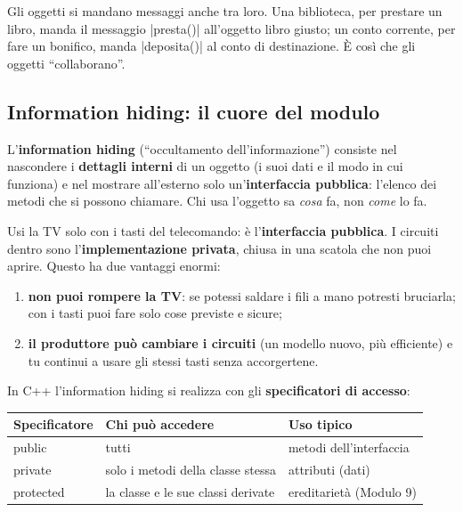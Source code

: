Gli oggetti si mandano messaggi anche tra loro. Una biblioteca, per prestare un
libro, manda il messaggio \cc|presta()| all'oggetto libro giusto; un conto
corrente, per fare un bonifico, manda \cc|deposita()| al conto di destinazione.
È così che gli oggetti ``collaborano''.

\subsection*{Information hiding: il cuore del modulo}

\begin{definizione}
L'\textbf{information hiding} (``occultamento dell'informazione'') consiste nel
nascondere i \textbf{dettagli interni} di un oggetto (i suoi dati e il modo in
cui funziona) e nel mostrare all'esterno solo un'\textbf{interfaccia pubblica}:
l'elenco dei metodi che si possono chiamare. Chi usa l'oggetto sa \emph{cosa}
fa, non \emph{come} lo fa.
\end{definizione}

\begin{analogia}[: il telecomando e la TV]
Usi la TV solo con i tasti del telecomando: è l'\textbf{interfaccia pubblica}.
I circuiti dentro sono l'\textbf{implementazione privata}, chiusa in una scatola
che non puoi aprire. Questo ha due vantaggi enormi:
\begin{enumerate}
  \item \textbf{non puoi rompere la TV}: se potessi saldare i fili a mano
        potresti bruciarla; con i tasti puoi fare solo cose previste e sicure;
  \item \textbf{il produttore può cambiare i circuiti} (un modello nuovo, più
        efficiente) e tu continui a usare gli stessi tasti senza accorgertene.
\end{enumerate}
\end{analogia}

In C++ l'information hiding si realizza con gli \textbf{specificatori di accesso}:

\begin{center}
\begin{tabular}{>{\ttfamily}l l l}
\toprule
\textrm{\textbf{Specificatore}} & \textbf{Chi può accedere} & \textbf{Uso tipico} \\
\midrule
public    & tutti                                   & metodi dell'interfaccia \\
private   & solo i metodi della classe stessa       & attributi (dati) \\
protected & la classe e le sue classi derivate      & ereditarietà (Modulo 9) \\
\bottomrule
\end{tabular}
\end{center}

